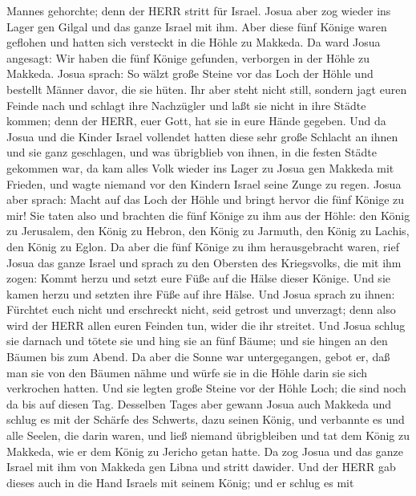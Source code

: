 Mannes gehorchte; denn der HERR stritt für Israel.  Josua
aber zog wieder ins Lager gen Gilgal und das ganze Israel mit ihm.
 Aber diese fünf Könige waren geflohen und hatten sich
versteckt in die Höhle zu Makkeda.  Da ward Josua angesagt:
Wir haben die fünf Könige gefunden, verborgen in der Höhle zu Makkeda.
 Josua sprach: So wälzt große Steine vor das Loch der Höhle
und bestellt Männer davor, die sie hüten.  Ihr aber steht
nicht still, sondern jagt euren Feinde nach und schlagt ihre Nachzügler
und laßt sie nicht in ihre Städte kommen; denn der HERR, euer Gott, hat
sie in eure Hände gegeben.  Und da Josua und die Kinder
Israel vollendet hatten diese sehr große Schlacht an ihnen und sie ganz
geschlagen, und was übrigblieb von ihnen, in die festen Städte gekommen
war,  da kam alles Volk wieder ins Lager zu Josua gen
Makkeda mit Frieden, und wagte niemand vor den Kindern Israel seine
Zunge zu regen.  Josua aber sprach: Macht auf das Loch der
Höhle und bringt hervor die fünf Könige zu mir!  Sie taten
also und brachten die fünf Könige zu ihm aus der Höhle: den König zu
Jerusalem, den König zu Hebron, den König zu Jarmuth, den König zu
Lachis, den König zu Eglon.  Da aber die fünf Könige zu ihm
herausgebracht waren, rief Josua das ganze Israel und sprach zu den
Obersten des Kriegsvolks, die mit ihm zogen: Kommt herzu und setzt eure
Füße auf die Hälse dieser Könige. Und sie kamen herzu und setzten ihre
Füße auf ihre Hälse.  Und Josua sprach zu ihnen: Fürchtet
euch nicht und erschreckt nicht, seid getrost und unverzagt; denn also
wird der HERR allen euren Feinden tun, wider die ihr streitet.
 Und Josua schlug sie darnach und tötete sie und hing sie
an fünf Bäume; und sie hingen an den Bäumen bis zum Abend. 
Da aber die Sonne war untergegangen, gebot er, daß man sie von den
Bäumen nähme und würfe sie in die Höhle darin sie sich verkrochen
hatten. Und sie legten große Steine vor der Höhle Loch; die sind noch da
bis auf diesen Tag.  Desselben Tages aber gewann Josua auch
Makkeda und schlug es mit der Schärfe des Schwerts, dazu seinen König,
und verbannte es und alle Seelen, die darin waren, und ließ niemand
übrigbleiben und tat dem König zu Makkeda, wie er dem König zu Jericho
getan hatte.  Da zog Josua und das ganze Israel mit ihm von
Makkeda gen Libna und stritt dawider.  Und der HERR gab
dieses auch in die Hand Israels mit seinem König; und er schlug es mit
